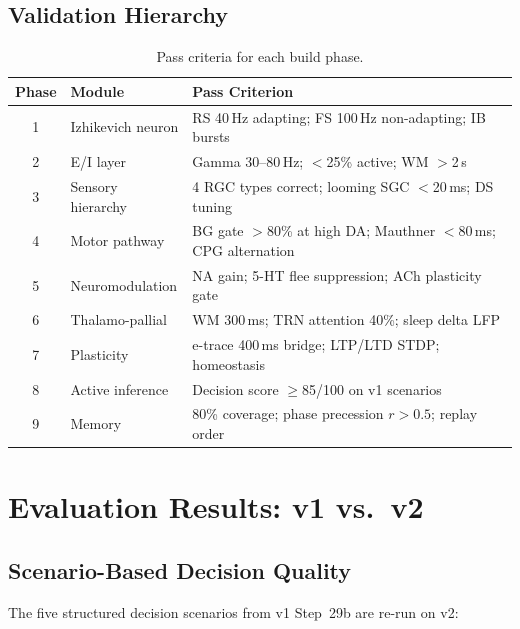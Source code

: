 \documentclass[11pt,a4paper]{article}
\begin{document}
\subsection{Validation Hierarchy}

\begin{table}[H]
\centering
\caption{Pass criteria for each build phase.}
\label{tab:pass_criteria}
\begin{tabular}{clp{8cm}}
\toprule
Phase & Module & Pass Criterion \\
\midrule
1 & Izhikevich neuron   & RS 40\,Hz adapting; FS 100\,Hz non-adapting; IB bursts \\
2 & E/I layer           & Gamma 30--80\,Hz; $<$25\% active; WM $>$2\,s \\
3 & Sensory hierarchy   & 4 RGC types correct; looming SGC $<$20\,ms; DS tuning \\
4 & Motor pathway       & BG gate $>$80\% at high DA; Mauthner $<$80\,ms; CPG alternation \\
5 & Neuromodulation     & NA gain; 5-HT flee suppression; ACh plasticity gate \\
6 & Thalamo-pallial     & WM 300\,ms; TRN attention 40\%; sleep delta LFP \\
7 & Plasticity          & e-trace 400\,ms bridge; LTP/LTD STDP; homeostasis \\
8 & Active inference    & Decision score $\geq$85/100 on v1 scenarios \\
9 & Memory              & 80\% coverage; phase precession $r>0.5$; replay order \\
\bottomrule
\end{tabular}
\end{table}

\section{Evaluation Results: v1 vs.\ v2}\label{sec:evaluation}

\subsection{Scenario-Based Decision Quality}

The five structured decision scenarios from v1 Step~29b are re-run on v2:
\end{document}
